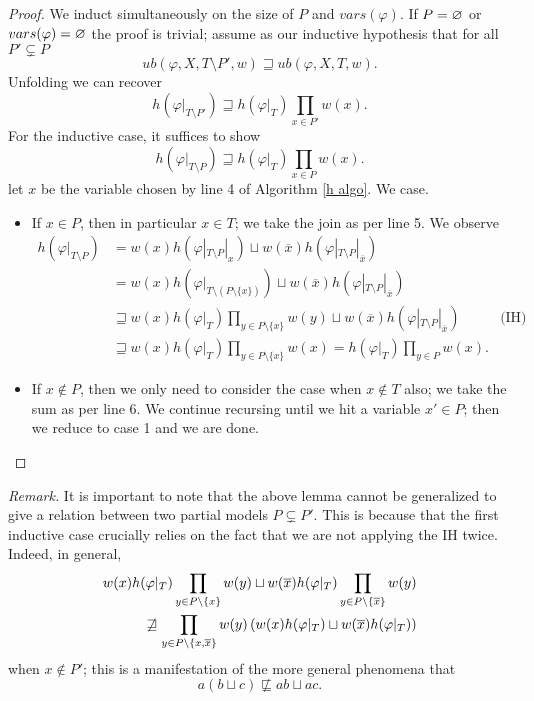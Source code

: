 \documentclass[acmsmall,review]{acmart}\settopmatter{printfolios=true,printccs=false,printacmref=false}
\begin{document}
\begin{proof}
  We induct simultaneously on the size of $P$ and $vars(\varphi)$. If $P = \varnothing$ or $vars(\varphi) = \varnothing$ the proof is trivial; assume as our inductive hypothesis that for all $P' \subsetneq P$
  \begin{equation}
    ub(\varphi, X, T\setminus P', w) \sqsupseteq ub(\varphi, X, T, w).\tag{IH}
  \end{equation}
  Unfolding we can recover
  \begin{equation}
    h(\varphi|_{T \setminus P'}) \sqsupseteq h(\varphi|_T)\prod_{x \in P'} w(x).\tag{IH}
  \end{equation}
  For the inductive case, it suffices to show
  \begin{equation}
    h(\varphi|_{T \setminus P}) \sqsupseteq h(\varphi|_T)\prod_{x \in P} w(x).
  \end{equation}
  let $x$ be the variable chosen by line 4 of Algorithm \ref{h algo}. We case.
  \begin{itemize}
    \item If $x \in P$, then in particular $x \in T$; we take the join as per line 5. We observe
    \begin{align*}
      h(\varphi|_{T \setminus P})
        &=w(x)h(\varphi|_{T \setminus P}|_x) \sqcup w(\overline x)h(\varphi|_{T \setminus P}|_{\overline x}) \\
        &=w(x)h(\varphi|_{T \setminus (P \setminus \{x\})}) \sqcup w(\overline x)h(\varphi|_{T \setminus P}|_{\overline x}) \\  
        &\sqsupseteq w(x)h(\varphi|_T)\prod_{y \in P\setminus \{x\}}w(y) \sqcup w(\overline x)h(\varphi|_{T \setminus P}|_{\overline x})&\text{(IH)}\\  
        &\sqsupseteq w(x)h(\varphi|_T)\prod_{y \in P\setminus \{x\}}w(x) = \boxed{h(\varphi|_T)\prod_{y \in P}w(x).}    
    \end{align*}
    \item If $x \notin P$, then we only need to consider the case when $x \notin T$ also; we take the sum as per line 6. We continue recursing until we hit a variable $x' \in P$; then we reduce to case 1 and we are done.
  \end{itemize}
\end{proof}

\textit{Remark.} It is important to note that the above lemma cannot be generalized to give a relation between two partial models $P \subsetneq P'$. This is because that the first inductive case crucially relies on the fact that we are not applying the IH twice. Indeed, in general,
\begin{align*}
   w(x)h(\varphi|_T)\prod_{y \in P\setminus \{x\}}w(y) \sqcup w(\overline x)h(\varphi|_T)\prod_{y \in P\setminus \{\overline x\}} w(y) \\\quad 
   \not\sqsupseteq \prod_{y \in P \setminus \{x, \overline x\}} w(y) \left({w(x)h(\varphi|_T) \sqcup w(\overline x) h(\varphi|_T)}\right)
\end{align*}
when $x \notin P'$; this is a manifestation of the more general phenomena that
$$a(b \sqcup c) \not \sqsubseteq ab \sqcup ac.$$
\end{document}
